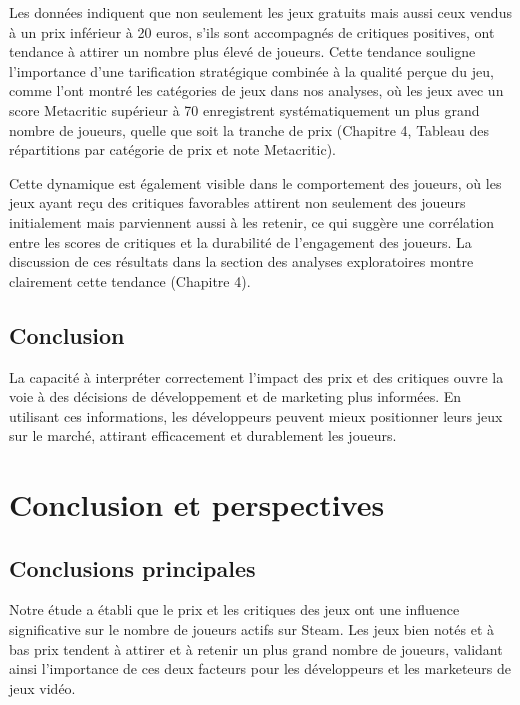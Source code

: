 \documentclass[mstat,12pt]{unswthesis}
\begin{document}
Les données indiquent que non seulement les jeux gratuits mais aussi
ceux vendus à un prix inférieur à 20 euros, s'ils sont accompagnés de
critiques positives, ont tendance à attirer un nombre plus élevé de
joueurs. Cette tendance souligne l'importance d'une tarification
stratégique combinée à la qualité perçue du jeu, comme l'ont montré les
catégories de jeux dans nos analyses, où les jeux avec un score
Metacritic supérieur à 70 enregistrent systématiquement un plus grand
nombre de joueurs, quelle que soit la tranche de prix (Chapitre 4,
Tableau des répartitions par catégorie de prix et note Metacritic).

\medskip

Cette dynamique est également visible dans le comportement des joueurs,
où les jeux ayant reçu des critiques favorables attirent non seulement
des joueurs initialement mais parviennent aussi à les retenir, ce qui
suggère une corrélation entre les scores de critiques et la durabilité
de l'engagement des joueurs. La discussion de ces résultats dans la
section des analyses exploratoires montre clairement cette tendance
(Chapitre 4).

\hypertarget{conclusion-1}{%
\section{Conclusion}\label{conclusion-1}}

La capacité à interpréter correctement l'impact des prix et des
critiques ouvre la voie à des décisions de développement et de marketing
plus informées. En utilisant ces informations, les développeurs peuvent
mieux positionner leurs jeux sur le marché, attirant efficacement et
durablement les joueurs.

\hypertarget{conclusion-et-perspectives}{%
\chapter{Conclusion et perspectives}\label{conclusion-et-perspectives}}

\hypertarget{conclusions-principales}{%
\section{Conclusions principales}\label{conclusions-principales}}

Notre étude a établi que le prix et les critiques des jeux ont une
influence significative sur le nombre de joueurs actifs sur Steam. Les
jeux bien notés et à bas prix tendent à attirer et à retenir un plus
grand nombre de joueurs, validant ainsi l'importance de ces deux
facteurs pour les développeurs et les marketeurs de jeux vidéo.
\end{document}
